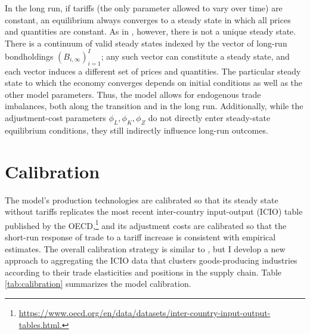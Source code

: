 \documentclass[12pt]{article}
\begin{document}
In the long run, if tariffs (the only parameter allowed to vary over time) are constant, an equilibrium always converges to a steady state in which all prices and quantities are constant. As in \citet{KRS_2018}, however, there is not a unique steady state. There is a continuum of valid steady states indexed by the vector of long-run bondholdings $(B_{i,\infty})_{i=1}^I$; any such vector can constitute a steady state, and each vector induces a different set of prices and quantities. The particular steady state to which the economy converges depends on initial conditions as well as the other model parameters. Thus, the model allows for endogenous trade imbalances, both along the transition and in the long run. Additionally, while the adjustment-cost parameters $\phi_L,\phi_K,\phi_Z$ do not directly enter steady-state equilibrium conditions, they still indirectly influence long-run outcomes.

\section{Calibration}
\label{sec:calibration}
The model's production technologies are calibrated so that its steady state without tariffs replicates the most recent inter-country input-output (ICIO) table published by the OECD,\footnote{\url{https://www.oecd.org/en/data/datasets/inter-country-input-output-tables.html.}} and its adjustment costs are calibrated so that the short-run response of trade to a tariff increase is consistent with empirical estimates. The overall calibration strategy is similar to \citet{cje_nafta}, but I develop a new approach to aggregating the ICIO data that clusters goods-producing industries according to their trade elasticities and positions in the supply chain. Table \ref{tab:calibration} summarizes the model calibration.
\end{document}

